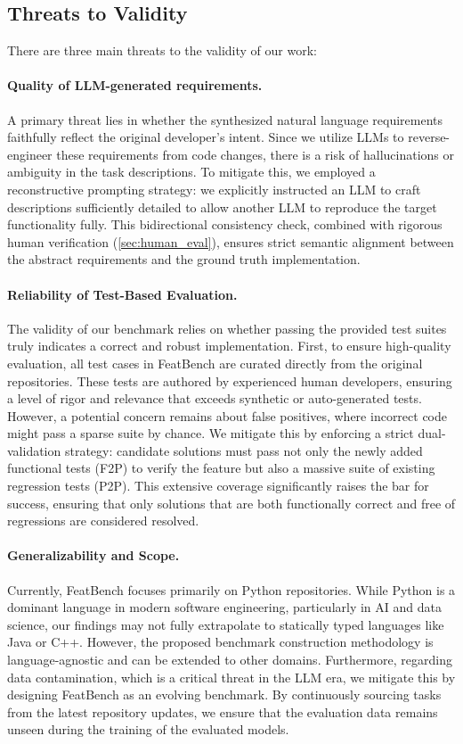 \subsection{Threats to Validity}
There are three main threats to the validity of our work:

\paragraph{\textbf{Quality of LLM-generated requirements.}}
A primary threat lies in whether the synthesized natural language requirements faithfully reflect the original developer's intent.
Since we utilize LLMs to reverse-engineer these requirements from code changes, there is a risk of hallucinations or ambiguity in the task descriptions.
To mitigate this, we employed a reconstructive prompting strategy: we explicitly instructed an LLM to craft descriptions sufficiently detailed to allow another LLM to reproduce the target functionality fully.
This bidirectional consistency check, combined with rigorous human verification (\cref{sec:human_eval}), ensures strict semantic alignment between the abstract requirements and the ground truth implementation.

\paragraph{\textbf{Reliability of Test-Based Evaluation.}}
The validity of our benchmark relies on whether passing the provided test suites truly indicates a correct and robust implementation.
First, to ensure high-quality evaluation, all test cases in FeatBench are curated directly from the original repositories.
These tests are authored by experienced human developers, ensuring a level of rigor and relevance that exceeds synthetic or auto-generated tests.
However, a potential concern remains about false positives, where incorrect code might pass a sparse suite by chance.
We mitigate this by enforcing a strict dual-validation strategy: candidate solutions must pass not only the newly added functional tests (F2P) to verify the feature but also a massive suite of existing regression tests (P2P).
This extensive coverage significantly raises the bar for success, ensuring that only solutions that are both functionally correct and free of regressions are considered resolved.

\paragraph{\textbf{Generalizability and Scope.}}
Currently, FeatBench focuses primarily on Python repositories.
While Python is a dominant language in modern software engineering, particularly in AI and data science, our findings may not fully extrapolate to statically typed languages like Java or C++.
However, the proposed benchmark construction methodology is language-agnostic and can be extended to other domains.
Furthermore, regarding data contamination, which is a critical threat in the LLM era, we mitigate this by designing FeatBench as an evolving benchmark.
By continuously sourcing tasks from the latest repository updates, we ensure that the evaluation data remains unseen during the training of the evaluated models.